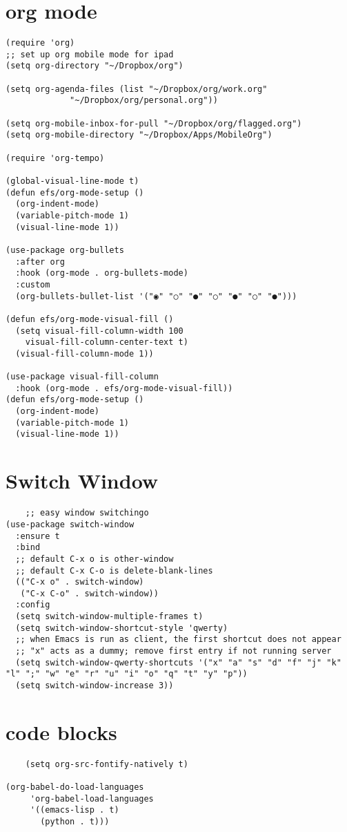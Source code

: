 \documentclass[11pt]{article}
\begin{document}
\section{org mode}
\label{sec:orgb44822d}
\begin{verbatim}
(require 'org)
;; set up org mobile mode for ipad
(setq org-directory "~/Dropbox/org")

(setq org-agenda-files (list "~/Dropbox/org/work.org"
			 "~/Dropbox/org/personal.org"))

(setq org-mobile-inbox-for-pull "~/Dropbox/org/flagged.org")
(setq org-mobile-directory "~/Dropbox/Apps/MobileOrg")

(require 'org-tempo)

(global-visual-line-mode t)
(defun efs/org-mode-setup ()
  (org-indent-mode)
  (variable-pitch-mode 1)
  (visual-line-mode 1))

(use-package org-bullets
  :after org
  :hook (org-mode . org-bullets-mode)
  :custom
  (org-bullets-bullet-list '("◉" "○" "●" "○" "●" "○" "●")))

(defun efs/org-mode-visual-fill ()
  (setq visual-fill-column-width 100
	visual-fill-column-center-text t)
  (visual-fill-column-mode 1))

(use-package visual-fill-column
  :hook (org-mode . efs/org-mode-visual-fill))
(defun efs/org-mode-setup ()
  (org-indent-mode)
  (variable-pitch-mode 1)
  (visual-line-mode 1))

\end{verbatim}
\section{Switch Window}
\label{sec:orga5e5cb2}
\begin{verbatim}
    ;; easy window switchingo
(use-package switch-window
  :ensure t
  :bind
  ;; default C-x o is other-window
  ;; default C-x C-o is delete-blank-lines
  (("C-x o" . switch-window)
   ("C-x C-o" . switch-window))
  :config
  (setq switch-window-multiple-frames t)
  (setq switch-window-shortcut-style 'qwerty)
  ;; when Emacs is run as client, the first shortcut does not appear
  ;; "x" acts as a dummy; remove first entry if not running server
  (setq switch-window-qwerty-shortcuts '("x" "a" "s" "d" "f" "j" "k" "l" ";" "w" "e" "r" "u" "i" "o" "q" "t" "y" "p"))
  (setq switch-window-increase 3))
\end{verbatim}

\section{code blocks}
\label{sec:orgf50f5a8}
\begin{verbatim}
    (setq org-src-fontify-natively t)

(org-babel-do-load-languages
	 'org-babel-load-languages
	 '((emacs-lisp . t)
	   (python . t)))
\end{verbatim}
\end{document}
